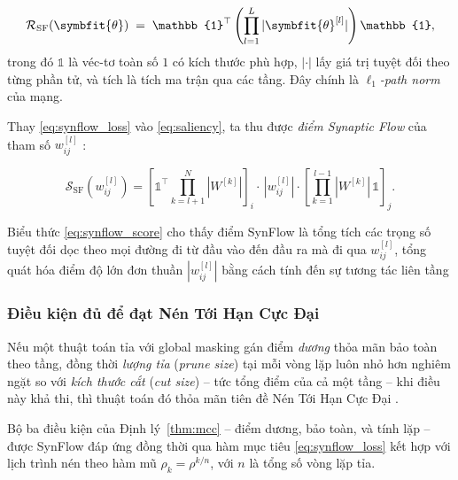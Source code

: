 \begin{equation}
    \mathcal{R}_{\mathrm{SF}}(\symbfit{\theta})
    \;=\; \mathbb{1}^{\top}
    \left(\prod_{l=1}^{L} |\symbfit{\theta}^{[l]}|\right)
    \mathbb{1},
    \label{eq:synflow_loss}
\end{equation}
trong đó $\mathbb{1}$ là véc-tơ toàn số $1$ có kích thước phù hợp,
$|\cdot|$ lấy giá trị tuyệt đối theo từng phần tử, và tích là tích ma trận
qua các tầng. Đây chính là \emph{$\ell_1$-path norm} của mạng.

Thay \eqref{eq:synflow_loss} vào \eqref{eq:saliency}, ta thu được
\emph{điểm Synaptic Flow} của tham số $w^{[l]}_{ij}$ \cite{synflow}:

\begin{equation}
    \mathcal{S}_{\mathrm{SF}}\!\left(w^{[l]}_{ij}\right)
    = \left[\mathbb{1}^{\top}
    \prod_{k=l+1}^{N}\!\left|W^{[k]}\right|\right]_{\!i}
    \cdot\, \left|w^{[l]}_{ij}\right|
    \cdot \left[\prod_{k=1}^{l-1}\!\left|W^{[k]}\right|\,\mathbb{1}\right]_{\!j}.
    \label{eq:synflow_score}
\end{equation}

Biểu thức \eqref{eq:synflow_score} cho thấy điểm SynFlow là tổng tích các
trọng số tuyệt đối dọc theo mọi đường đi từ đầu vào đến đầu ra mà đi qua
$w^{[l]}_{ij}$, tổng quát hóa điểm độ lớn đơn thuần $|w^{[l]}_{ij}|$ bằng
cách tính đến sự tương tác liên tầng \cite{synflow}
\subsubsection{\textbf{Điều kiện đủ để đạt Nén Tới Hạn Cực Đại}}

\begin{theorem}
    \label{thm:mcc}
    Nếu một thuật toán tỉa với global masking gán điểm \emph{dương} thỏa mãn
    bảo toàn theo tầng, đồng thời \emph{lượng tỉa} (\emph{prune size}) tại mỗi
    vòng lặp luôn nhỏ hơn nghiêm ngặt so với \emph{kích thước cắt} (\emph{cut
        size}) -- tức tổng điểm của cả một tầng -- khi điều này khả thi, thì thuật
    toán đó thỏa mãn tiên đề Nén Tới Hạn Cực Đại {\cite{synflow}}.
\end{theorem}

\noindent
Bộ ba điều kiện của Định lý~\ref{thm:mcc} -- điểm dương, bảo toàn, và tính
lặp -- được SynFlow đáp ứng đồng thời qua hàm mục tiêu \eqref{eq:synflow_loss}
kết hợp với lịch trình nén theo hàm mũ $\rho_k = \rho^{k/n}$, với $n$ là tổng
số vòng lặp tỉa.

